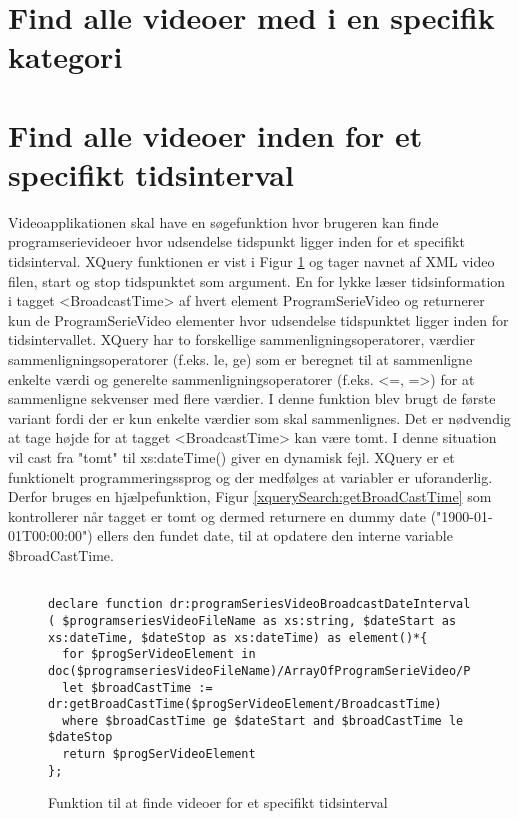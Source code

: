 \section{Find alle videoer med i en specifik kategori}







\section{Find alle videoer inden for et specifikt tidsinterval}

Videoapplikationen skal have en søgefunktion hvor brugeren kan finde programserievideoer hvor udsendelse tidspunkt ligger inden for et specifikt tidsinterval. XQuery funktionen er vist i Figur \ref{xquerySearch:programSeriesVideoBroadcastDateInterval} og tager navnet af XML video filen, start og stop tidspunktet som argument. En for lykke læser tidsinformation i tagget <BroadcastTime> af hvert element ProgramSerieVideo og returnerer kun de ProgramSerieVideo elementer hvor udsendelse tidspunktet ligger inden for tidsintervallet. XQuery har to forskellige sammenligningsoperatorer, værdier sammenligningsoperatorer (f.eks. le, ge) som er beregnet til at sammenligne enkelte værdi og generelte sammenligningsoperatorer (f.eks. <=, =>) for at sammenligne sekvenser med flere værdier. I denne funktion blev brugt de første variant fordi der er kun enkelte værdier som skal sammenlignes. Det er nødvendig at tage højde for at tagget <BroadcastTime> kan være tomt. I denne situation vil cast fra "tomt" til xs:dateTime() giver en dynamisk fejl. XQuery er et funktionelt programmeringssprog og der medfølges at variabler er uforanderlig. Derfor bruges en hjælpefunktion, Figur \ref{xquerySearch:getBroadCastTime} som kontrollerer når tagget er tomt og dermed returnere en dummy date ("1900-01-01T00:00:00") ellers den fundet date, til at opdatere den interne variable \$broadCastTime.


\begin{figure}[ht]
\begin{lstlisting}[style=FAKE_XQUERY, language=XQUERY]

declare function dr:programSeriesVideoBroadcastDateInterval
( $programseriesVideoFileName as xs:string, $dateStart as xs:dateTime, $dateStop as xs:dateTime) as element()*{
  for $progSerVideoElement in doc($programseriesVideoFileName)/ArrayOfProgramSerieVideo/ProgramSerieVideo
  let $broadCastTime := dr:getBroadCastTime($progSerVideoElement/BroadcastTime)
  where $broadCastTime ge $dateStart and $broadCastTime le $dateStop
  return $progSerVideoElement
}; 

\end{lstlisting}
\caption{Funktion til at finde videoer for et specifikt tidsinterval}
\label{xquerySearch:programSeriesVideoBroadcastDateInterval}
\end{figure}



